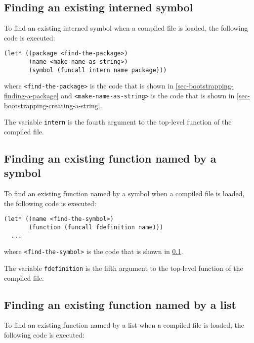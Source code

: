 \subsection{Finding an existing interned symbol}
\label{sec-bootstrapping-finding-an-existing-interned-symbol}

To find an existing interned symbol when a compiled file is loaded,
the following code is executed:

\begin{verbatim}
(let* ((package <find-the-package>)
       (name <make-name-as-string>)
       (symbol (funcall intern name package)))
\end{verbatim}

where \texttt{<find-the-package>} is the code that is shown in
\ref{sec-bootstrapping-finding-a-package} and
\texttt{<make-name-as-string>} is the code that is shown in
\ref{sec-bootstrapping-creating-a-string}.

The variable \texttt{intern} is the fourth argument to the
top-level function of the compiled file.

\subsection{Finding an existing function named by a symbol}
\label{sec-bootstrapping-finding-an-existing-function-named-by-a-symbol}

To find an existing function named by a symbol when a compiled file is
loaded, the following code is executed:

\begin{verbatim}
(let* ((name <find-the-symbol>)
       (function (funcall fdefinition name)))
  ...
\end{verbatim}

where \texttt{<find-the-symbol>} is the code that is shown in
\ref{sec-bootstrapping-finding-an-existing-interned-symbol}.

The variable \texttt{fdefinition} is the fifth argument to the
top-level function of the compiled file.

\subsection{Finding an existing function named by a list}
\label{sec-bootstrapping-finding-an-existing-function-named-by-a-list}

To find an existing function named by a list when a compiled file is
loaded, the following code is executed:

